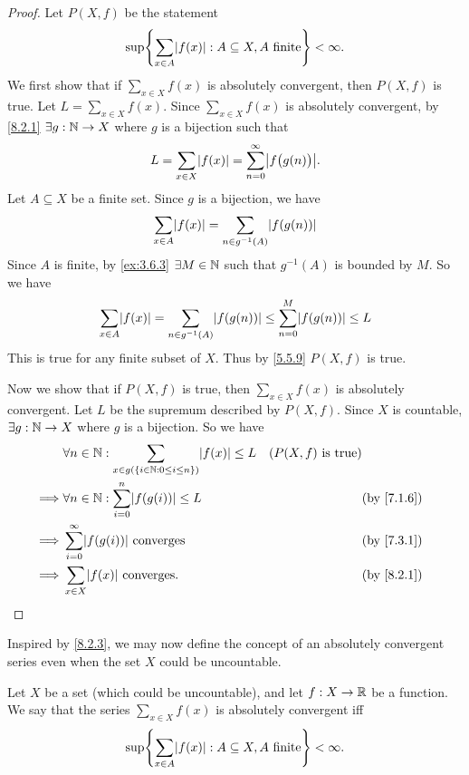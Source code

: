 \begin{proof}
	Let \(P(X, f)\) be the statement
	\[
		\sup\set{\sum_{x \in A} \abs{f(x)} : A \subseteq X, A \text{ finite}} < \infty.
	\]
	We first show that if \(\sum_{x \in X} f(x)\) is absolutely convergent, then \(P(X, f)\) is true.
	Let \(L = \sum_{x \in X} f(x)\).
	Since \(\sum_{x \in X} f(x)\) is absolutely convergent, by \cref{8.2.1} \(\exists g : \mathbb{N} \to X\) where \(g\) is a bijection such that
	\[
		L = \sum_{x \in X} \abs{f(x)} = \sum_{n = 0}^\infty \abs{f\big(g(n)\big)}.
	\]
	Let \(A \subseteq X\) be a finite set.
	Since \(g\) is a bijection, we have
	\[
		\sum_{x \in A} \abs{f(x)} = \sum_{n \in g^{-1}(A)} \abs{f(g(n))}
	\]
	Since \(A\) is finite, by \cref{ex:3.6.3} \(\exists M \in \mathbb{N}\) such that \(g^{-1}(A)\) is bounded by \(M\).
	So we have
	\[
		\sum_{x \in A} \abs{f(x)} = \sum_{n \in g^{-1}(A)} \abs{f(g(n))} \leq \sum_{n = 0}^M \abs{f(g(n))} \leq L
	\]
	This is true for any finite subset of \(X\).
	Thus by \cref{5.5.9} \(P(X, f)\) is true.

	Now we show that if \(P(X, f)\) is true, then \(\sum_{x \in X} f(x)\) is absolutely convergent.
	Let \(L\) be the supremum described by \(P(X, f)\).
	Since \(X\) is countable, \(\exists g : \mathbb{N} \to X\) where \(g\) is a bijection.
	So we have
	\begin{align*}
		         & \forall n \in \N : \sum_{x \in g(\set{i \in \N : 0 \leq i \leq n})} \abs{f(x)} \leq L & (P(X, f) \text{ is true})              \\
		\implies & \forall n \in \N : \sum_{i = 0}^n \abs{f(g(i))} \leq L                                &                           & \by{7.1.6} \\
		\implies & \sum_{i = 0}^\infty \abs{f(g(i))} \text{ converges}                                   &                           & \by{7.3.1} \\
		\implies & \sum_{x \in X} \abs{f(x)} \text{ converges}.                                          &                           & \by{8.2.1}
	\end{align*}
\end{proof}

\begin{note}
	Inspired by \cref{8.2.3}, we may now define the concept of an absolutely convergent series even when the set \(X\) could be uncountable.
\end{note}

\begin{defn}\label{8.2.4}
	Let \(X\) be a set (which could be uncountable), and let \(f : X \to \mathbb{R}\) be a function.
	We say that the series \(\sum_{x \in X} f(x)\) is absolutely convergent iff
	\[
		\sup\set{\sum_{x \in A} \abs{f(x)} : A \subseteq X, A \text{ finite}} < \infty.
	\]
\end{defn}

